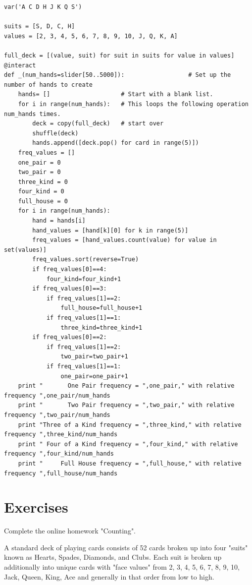 \documentclass[10pt,]{book}
\theoremstyle{plain}
\theoremstyle{definition}
\theoremstyle{definition}
\theoremstyle{definition}
\numberwithin{equation}{section}
\begin{document}
\begin{lstlisting}[style=sageinput]
var('A C D H J K Q S') 

suits = [S, D, C, H] 
values = [2, 3, 4, 5, 6, 7, 8, 9, 10, J, Q, K, A] 

full_deck = [(value, suit) for suit in suits for value in values]
@interact
def _(num_hands=slider[50..5000]):                  # Set up the number of hands to create
    hands= []                    # Start with a blank list. 
    for i in range(num_hands):   # This loops the following operation num_hands times. 
        deck = copy(full_deck)   # start over
        shuffle(deck)
        hands.append([deck.pop() for card in range(5)])
    freq_values = []
    one_pair = 0
    two_pair = 0
    three_kind = 0
    four_kind = 0
    full_house = 0
    for i in range(num_hands):
        hand = hands[i]
        hand_values = [hand[k][0] for k in range(5)]
        freq_values = [hand_values.count(value) for value in set(values)]
        freq_values.sort(reverse=True)
        if freq_values[0]==4:
            four_kind=four_kind+1
        if freq_values[0]==3:
            if freq_values[1]==2:
                full_house=full_house+1
            if freq_values[1]==1:
                three_kind=three_kind+1
        if freq_values[0]==2:
            if freq_values[1]==2:
                two_pair=two_pair+1
            if freq_values[1]==1:
                one_pair=one_pair+1
    print "       One Pair frequency = ",one_pair," with relative frequency ",one_pair/num_hands
    print "       Two Pair frequency = ",two_pair," with relative frequency ",two_pair/num_hands
    print "Three of a Kind frequency = ",three_kind," with relative frequency ",three_kind/num_hands
    print " Four of a Kind frequency = ",four_kind," with relative frequency ",four_kind/num_hands
    print "     Full House frequency = ",full_house," with relative frequency ",full_house/num_hands
\end{lstlisting}
\typeout{************************************************}
\typeout{************************************************}
\section[{Exercises}]{Exercises}\label{section-18}
Complete the online homework "Counting".%
\par

A standard deck of playing cards consists of 52 cards broken up into four "suits" known as Hearts, Spades, Diamonds, and Clubs. Each suit is broken up additionally into unique cards with "face values" from {2, 3, 4, 5, 6, 7, 8, 9, 10, Jack, Queen, King, Ace} and generally in that order from low to high.%
\par
\end{document}
